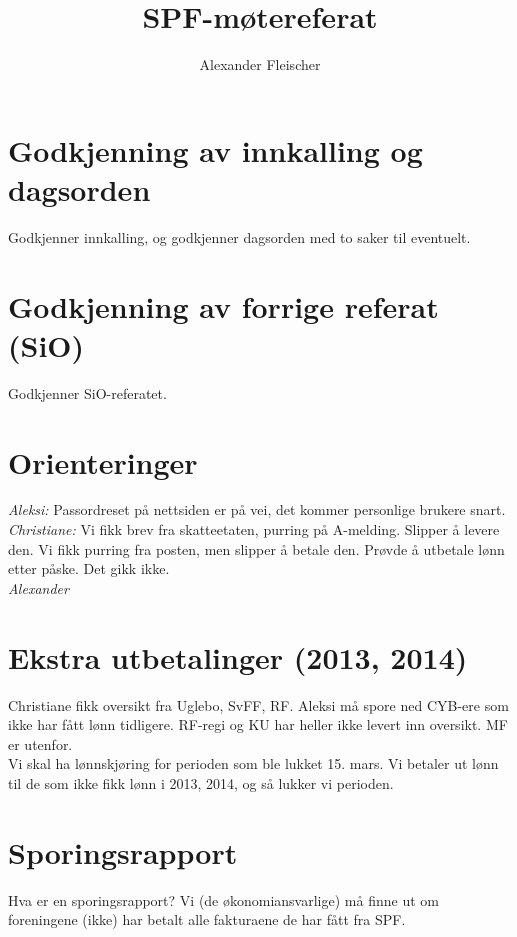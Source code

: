 \documentclass[12pt,norsk]{article}
\begin{document}
\title{SPF-møtereferat}
\author{Alexander Fleischer}
\maketitle



\section{Godkjenning av innkalling og dagsorden}
Godkjenner innkalling, og godkjenner dagsorden med to saker til eventuelt.

\section{Godkjenning av forrige referat (SiO)}
Godkjenner SiO-referatet.

\section{Orienteringer}
\textit{Aleksi:} 
Passordreset på nettsiden er på vei, det kommer personlige brukere snart.\\

\noindent \textit{Christiane:} Vi fikk brev fra skatteetaten, purring på A-melding.
Slipper å levere den.
Vi fikk purring fra posten, men slipper å betale den.
Prøvde å utbetale lønn etter påske. Det gikk ikke.\\

\noindent \textit{Alexander} 

\section{Ekstra utbetalinger (2013, 2014)}
Christiane fikk oversikt fra Uglebo, SvFF, RF.
Aleksi må spore ned CYB-ere som ikke har fått lønn tidligere.
RF-regi og KU har heller ikke levert inn oversikt.
MF er utenfor.\\

\noindent Vi skal ha lønnskjøring for perioden som ble lukket 15. mars.
Vi betaler ut lønn til de som ikke fikk lønn i 2013, 2014,
og så lukker vi perioden.

\section{Sporingsrapport}
Hva er en sporingsrapport? Vi (de økonomiansvarlige) må finne ut om
foreningene (ikke) har betalt alle fakturaene de har fått fra SPF.\\
\end{document}
